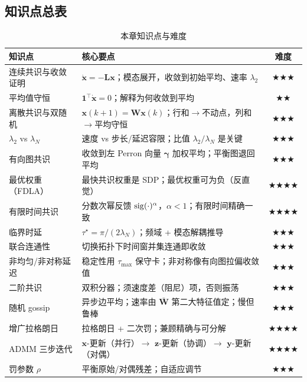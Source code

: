 \subsection*{知识点总表}
\begin{table}[H]\centering\small
\caption{本章知识点与难度}
\label{tab:cs-knowledge}
\begin{tabular}{p{4.4cm}p{8.0cm}c}
\toprule
知识点 & 核心要点 & 难度 \\
\midrule
连续共识与收敛证明 & $\dot{\mathbf{x}}=-\mathbf{L}\mathbf{x}$；模态展开，收敛到初始平均、速率 $\lambda_2$ & $\bigstar\bigstar\bigstar$ \\
平均值守恒 & $\mathbf{1}^\top\dot{\mathbf{x}}=0$；解释为何收敛到平均 & $\bigstar\bigstar$ \\
离散共识与双随机 & $\mathbf{x}(k{+}1)=\mathbf{W}\mathbf{x}(k)$；行和$\to$不动点，列和$\to$平均守恒 & $\bigstar\bigstar\bigstar$ \\
$\lambda_2$ vs $\lambda_N$ & 速度 vs 步长/延迟容限；比值 $\lambda_2/\lambda_N$ 是关键 & $\bigstar\bigstar\bigstar$ \\
有向图共识 & 收敛到左 Perron 向量 $\boldsymbol{\gamma}$ 加权平均；平衡图退回平均 & $\bigstar\bigstar\bigstar$ \\
最优权重（FDLA） & 最快共识权重是 SDP；最优权重可为负（反直觉） & $\bigstar\bigstar\bigstar\bigstar$ \\
有限时间共识 & 分数次幂反馈 $\operatorname{sig}(\cdot)^\alpha$，$\alpha<1$；有限时间精确一致 & $\bigstar\bigstar\bigstar\bigstar$ \\
临界时延 & $\tau^\star=\pi/(2\lambda_N)$；频域 + 模态解耦推导 & $\bigstar\bigstar\bigstar$ \\
联合连通性 & 切换拓扑下时间窗并集连通即收敛 & $\bigstar\bigstar\bigstar$ \\
非均匀/非对称延迟 & 稳定性用 $\tau_{\max}$ 保守卡；非对称像有向图拉偏收敛值 & $\bigstar\bigstar\bigstar$ \\
二阶共识 & 双积分器；须速度差（阻尼）项，否则振荡 & $\bigstar\bigstar\bigstar$ \\
随机 gossip & 异步边平均；速率由 $\bar{\mathbf{W}}$ 第二大特征值定；慢但鲁棒 & $\bigstar\bigstar\bigstar$ \\
增广拉格朗日 & 拉格朗日 + 二次罚；兼顾精确与可分解 & $\bigstar\bigstar\bigstar\bigstar$ \\
ADMM 三步迭代 & $\mathbf{x}$-更新（并行）$\to$ $\mathbf{z}$-更新（协调）$\to$ $\mathbf{y}$-更新（对偶） & $\bigstar\bigstar\bigstar\bigstar$ \\
罚参数 $\rho$ & 平衡原始/对偶残差；自适应调节 & $\bigstar\bigstar\bigstar$ \\

\end{tabular}
\end{table}
